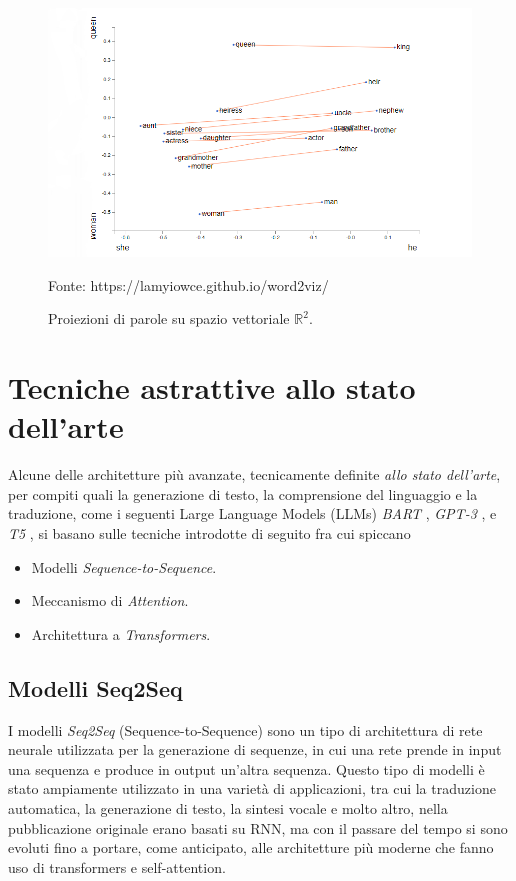 \documentclass[12pt,a4paper,twoside,openright]{book}
\begin{document}
\begin{figure}
    \centering
    \includegraphics[width=\textwidth]{images/word2vec-example.png}
    \caption{Proiezioni di parole su spazio vettoriale $\mathbb{R}^2$.}
    \tiny{Fonte: https://lamyiowce.github.io/word2viz/}
    \label{fig:word-embeddings}
\end{figure}

\section{Tecniche astrattive allo stato dell'arte}
Alcune delle architetture più avanzate, tecnicamente definite \emph{allo stato dell'arte}, per compiti quali la generazione di testo, la comprensione del linguaggio e la traduzione, come i seguenti Large Language Models (LLMs) \emph{BART} \cite{DBLP:journals/corr/abs-1910-13461}, \emph{GPT-3} \cite{DBLP:journals/corr/abs-2005-14165}, e \emph{T5} \cite{DBLP:journals/corr/abs-1910-10683}, si basano sulle tecniche introdotte di seguito fra cui spiccano
\begin{itemize}
    \item Modelli \emph{Sequence-to-Sequence}.
    \item Meccanismo di \emph{Attention}.
    \item Architettura a \emph{Transformers}.
\end{itemize}

\subsection{Modelli Seq2Seq}
I modelli \emph{Seq2Seq} (Sequence-to-Sequence) sono un tipo di architettura di rete neurale utilizzata per la generazione di sequenze, in cui una rete prende in input una sequenza e produce in output un'altra sequenza. Questo tipo di modelli è stato ampiamente utilizzato in una varietà di applicazioni, tra cui la traduzione automatica, la generazione di testo, la sintesi vocale e molto altro, nella pubblicazione originale \cite{cho2014learning} erano basati su RNN, ma con il passare del tempo si sono evoluti fino a portare, come anticipato, alle architetture più moderne che fanno uso di transformers e self-attention.
\end{document}
